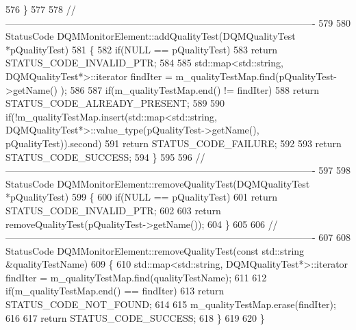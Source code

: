 \begin{DoxyCode}
576 \}
577 
578 \textcolor{comment}{//-------------------------------------------------------------------------------------------------}
579 
580 StatusCode DQMMonitorElement::addQualityTest(DQMQualityTest *pQualityTest)
581 \{
582   \textcolor{keywordflow}{if}(NULL == pQualityTest)
583     \textcolor{keywordflow}{return} STATUS\_CODE\_INVALID\_PTR;
584 
585   std::map<std::string, DQMQualityTest*>::iterator findIter = m\_qualityTestMap.find(pQualityTest->getName()
      );
586 
587   \textcolor{keywordflow}{if}(m\_qualityTestMap.end() != findIter)
588     \textcolor{keywordflow}{return} STATUS\_CODE\_ALREADY\_PRESENT;
589 
590   \textcolor{keywordflow}{if}(!m\_qualityTestMap.insert(std::map<std::string, DQMQualityTest*>::value\_type(pQualityTest->getName(), 
      pQualityTest)).second)
591     \textcolor{keywordflow}{return} STATUS\_CODE\_FAILURE;
592 
593   \textcolor{keywordflow}{return} STATUS\_CODE\_SUCCESS;
594 \}
595 
596 \textcolor{comment}{//-------------------------------------------------------------------------------------------------}
597 
598 StatusCode DQMMonitorElement::removeQualityTest(DQMQualityTest *pQualityTest)
599 \{
600   \textcolor{keywordflow}{if}(NULL == pQualityTest)
601     \textcolor{keywordflow}{return} STATUS\_CODE\_INVALID\_PTR;
602 
603   \textcolor{keywordflow}{return} removeQualityTest(pQualityTest->getName());
604 \}
605 
606 \textcolor{comment}{//-------------------------------------------------------------------------------------------------}
607 
608 StatusCode DQMMonitorElement::removeQualityTest(\textcolor{keyword}{const} std::string &qualityTestName)
609 \{
610   std::map<std::string, DQMQualityTest*>::iterator findIter = m\_qualityTestMap.find(qualityTestName);
611 
612   \textcolor{keywordflow}{if}(m\_qualityTestMap.end() == findIter)
613     \textcolor{keywordflow}{return} STATUS\_CODE\_NOT\_FOUND;
614 
615   m\_qualityTestMap.erase(findIter);
616 
617   \textcolor{keywordflow}{return} STATUS\_CODE\_SUCCESS;
618 \}
619 
620 \} 
\end{DoxyCode}
